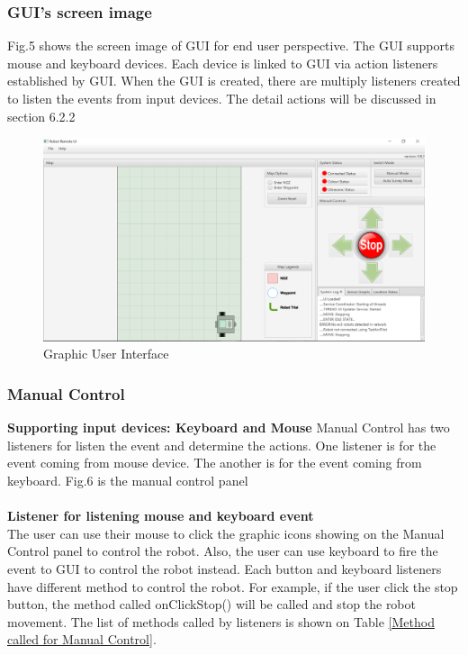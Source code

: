 \subsubsection{GUI's screen image}
Fig.5 shows the screen image of GUI for end user perspective. The GUI supports mouse and keyboard devices. Each device is linked to GUI via action listeners established by GUI. When the GUI is created, there are multiply listeners created to listen the events from input devices. The detail actions will be discussed in section 6.2.2  

\begin{figure}[H]
	\includegraphics[width=\linewidth]{GUI.png}  %
	\caption{Graphic User Interface}
	\label{fig:Graphic User Interface}              
\end{figure}

\subsubsection{Manual Control}
\textbf{Supporting input devices: Keyboard and Mouse}
Manual Control has two listeners for listen the event and determine the actions. One listener is for the event coming from mouse device. The another is for the event coming from keyboard. Fig.6 is the manual control panel \\
\\
\textbf{Listener for listening mouse and keyboard event}\\
The user can use their mouse to click the graphic icons showing on the Manual Control panel to control the robot. Also, the user can use keyboard to fire the event to GUI to control the robot instead. Each button and keyboard listeners have different method to control the robot. For example, if the user click the stop button, the method called onClickStop() will be called and stop the robot movement. The list of methods called by listeners is shown on Table \ref{Method called for Manual Control}.

